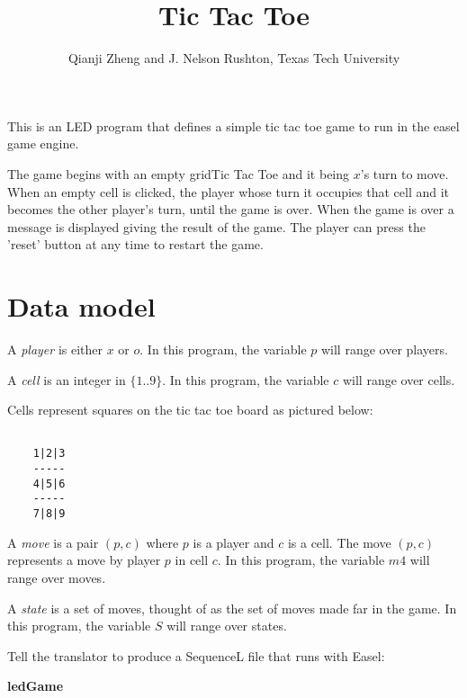 \documentclass{../src/led_doc}
\begin{document}
\begin{ledCmnt}
\title{Tic Tac Toe}
\date{}
\author{Qianji Zheng and J. Nelson Rushton, Texas Tech University}
\maketitle

This is an LED program that defines a simple tic tac toe game to run in the easel game engine.

The game begins with an empty gridTic Tac Toe
 and it being $x$'s turn to move. When an empty cell is clicked,
the player whose turn it occupies that cell and it becomes the other player's turn, until the
game is over. When the game is over a message is displayed giving the result of the  game.
The player can press the 'reset' button at any time to restart the game.

\section{Data model}


A {\em player} is either $x$ or $o$. In this program, the variable $p$ will range over players.

A {\em cell} is an integer in $\{1..9\}$. In this program, the variable $c$ will range over cells.

Cells represent squares on the tic tac toe board as pictured below:

\begin{verbatim}

    1|2|3
    -----
    4|5|6
    -----
    7|8|9

\end{verbatim}

A {\em move} is a pair $(p,c)$ where $p$ is a player and $c$ is a cell.
The move $(p,c)$ represents a move by player $p$ in cell $c$. In this program,
the variable $m4$ will range over moves.

A {\em state} is a set of moves, thought of as the set of moves made far in the
game. In this program, the variable $S$ will range over states.

Tell the translator to produce a SequenceL file that runs with Easel:
\end{ledCmnt}
\textbf{ledGame}
\end{document}
